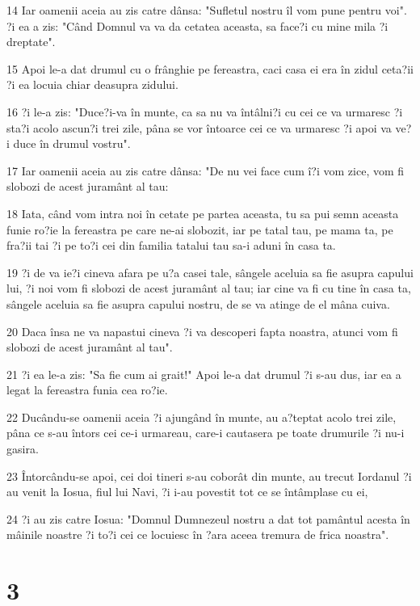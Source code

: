 \par 14 Iar oamenii aceia au zis catre dânsa: "Sufletul nostru îl vom pune pentru voi". ?i ea a zis: "Când Domnul va va da cetatea aceasta, sa face?i cu mine mila ?i dreptate".
\par 15 Apoi le-a dat drumul cu o frânghie pe fereastra, caci casa ei era în zidul ceta?ii ?i ea locuia chiar deasupra zidului.
\par 16 ?i le-a zis: "Duce?i-va în munte, ca sa nu va întâlni?i cu cei ce va urmaresc ?i sta?i acolo ascun?i trei zile, pâna se vor întoarce cei ce va urmaresc ?i apoi va ve?i duce în drumul vostru".
\par 17 Iar oamenii aceia au zis catre dânsa: "De nu vei face cum î?i vom zice, vom fi slobozi de acest juramânt al tau:
\par 18 Iata, când vom intra noi în cetate pe partea aceasta, tu sa pui semn aceasta funie ro?ie la fereastra pe care ne-ai slobozit, iar pe tatal tau, pe mama ta, pe fra?ii tai ?i pe to?i cei din familia tatalui tau sa-i aduni în casa ta.
\par 19 ?i de va ie?i cineva afara pe u?a casei tale, sângele aceluia sa fie asupra capului lui, ?i noi vom fi slobozi de acest juramânt al tau; iar cine va fi cu tine în casa ta, sângele aceluia sa fie asupra capului nostru, de se va atinge de el mâna cuiva.
\par 20 Daca însa ne va napastui cineva ?i va descoperi fapta noastra, atunci vom fi slobozi de acest juramânt al tau".
\par 21 ?i ea le-a zis: "Sa fie cum ai grait!" Apoi le-a dat drumul ?i s-au dus, iar ea a legat la fereastra funia cea ro?ie.
\par 22 Ducându-se oamenii aceia ?i ajungând în munte, au a?teptat acolo trei zile, pâna ce s-au întors cei ce-i urmareau, care-i cautasera pe toate drumurile ?i nu-i gasira.
\par 23 Întorcându-se apoi, cei doi tineri s-au coborât din munte, au trecut Iordanul ?i au venit la Iosua, fiul lui Navi, ?i i-au povestit tot ce se întâmplase cu ei,
\par 24 ?i au zis catre Iosua: "Domnul Dumnezeul nostru a dat tot pamântul acesta în mâinile noastre ?i to?i cei ce locuiesc în ?ara aceea tremura de frica noastra".

\chapter{3}

